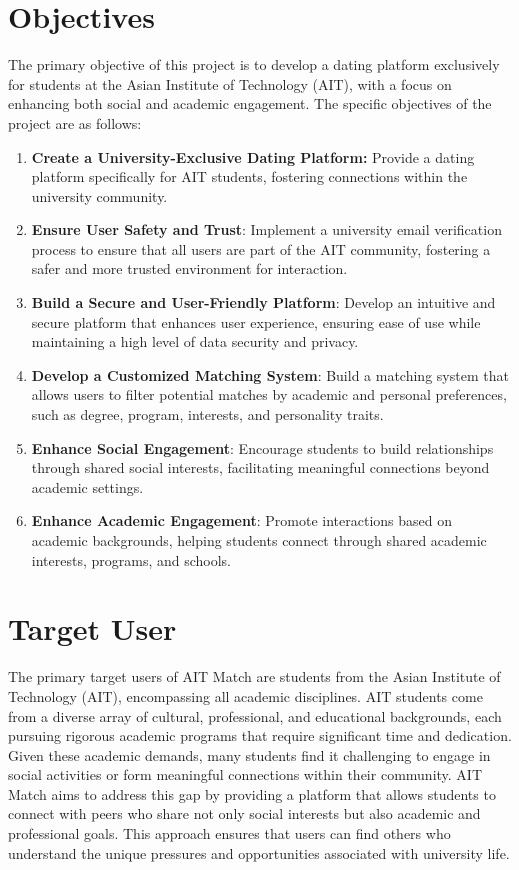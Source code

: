 \newpage
\section{Objectives}
    The primary objective of this project is to develop a dating platform exclusively for students at the Asian Institute of Technology (AIT), with a focus on enhancing both social and academic engagement. The specific objectives of the project are as follows:
    \sloppy
    \begin{enumerate}
        \item \textbf{Create a University-Exclusive Dating Platform:}
        Provide a dating platform specifically for AIT students, fostering connections within the university community.
        \item \textbf{Ensure User Safety and Trust}:
        Implement a university email verification process to ensure that all users are part of the AIT community, fostering a safer and more trusted environment for interaction.
        \item \textbf{Build a Secure and User-Friendly Platform}:
        Develop an intuitive and secure platform that enhances user experience, ensuring ease of use while maintaining a high level of data security and privacy.
        \item \textbf{Develop a Customized Matching System}:
        Build a matching system that allows users to filter potential matches by academic and personal preferences, such as degree, program, interests, and personality traits.
        \item \textbf{Enhance Social Engagement}:
        Encourage students to build relationships through shared social interests, facilitating meaningful connections beyond academic settings.
        \item \textbf{Enhance Academic Engagement}:
        Promote interactions based on academic backgrounds, helping students connect through shared academic interests, programs, and schools.
    \end{enumerate}


\newpage
\section{Target User}
The primary target users of AIT Match are students from the Asian Institute of Technology (AIT), encompassing all academic disciplines. AIT students come from a diverse array of cultural, professional, and educational backgrounds, each pursuing rigorous academic programs that require significant time and dedication. Given these academic demands, many students find it challenging to engage in social activities or form meaningful connections within their community. AIT Match aims to address this gap by providing a platform that allows students to connect with peers who share not only social interests but also academic and professional goals. This approach ensures that users can find others who understand the unique pressures and opportunities associated with university life.


